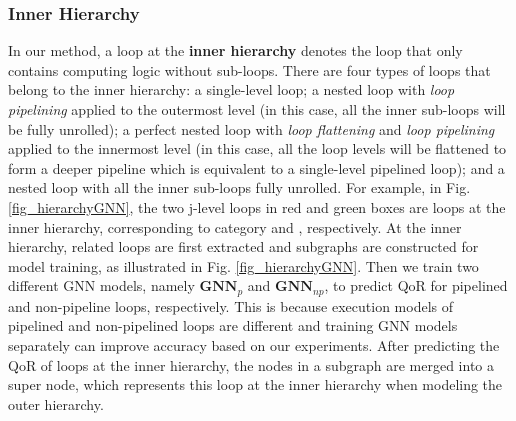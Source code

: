 \documentclass[conference]{IEEEtran}
\begin{document}
\subsubsection{Inner Hierarchy}
In our method, a loop at the \textbf{inner hierarchy} denotes the loop that only contains computing logic without sub-loops. There are four types of loops that belong to the inner hierarchy:  a single-level loop;  a nested loop with \textit{loop pipelining} applied to the outermost level (in this case, all the inner sub-loops will be fully unrolled);  a perfect nested loop with \textit{loop flattening} and \textit{loop pipelining} applied to the innermost level (in this case, all the loop levels will be flattened to form a deeper pipeline which is equivalent to a single-level pipelined loop); and  a nested loop with all the inner sub-loops fully unrolled. For example, in Fig. \ref{fig_hierarchyGNN}, the two j-level loops in red and green boxes are loops at the inner hierarchy, corresponding to category  and , respectively.
At the inner hierarchy, related loops are first extracted and subgraphs are constructed for model training, as illustrated in Fig. \ref{fig_hierarchyGNN}. Then we train two different GNN models, namely $\textbf{GNN}_p$ and $\textbf{GNN}_{np}$, to predict QoR for pipelined and non-pipeline loops, respectively. This is because execution models of pipelined and non-pipelined loops are different and training GNN models separately can improve accuracy based on our experiments. After predicting the QoR of loops at the inner hierarchy, the nodes in a subgraph 
are merged into a super node, which represents this loop at the inner hierarchy when modeling the outer hierarchy. 
\end{document}
